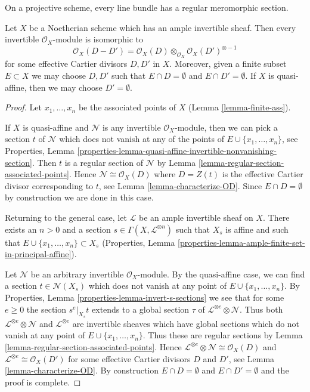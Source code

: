 \begin{lemma}
\label{lemma-quasi-projective-Noetherian-pic-effective-Cartier}
\begin{slogan}
On a projective scheme, every line bundle has a regular meromorphic section.
\end{slogan}
Let $X$ be a Noetherian scheme which has an ample invertible sheaf.
Then every invertible $\mathcal{O}_X$-module is isomorphic to
$$
\mathcal{O}_X(D - D') =
\mathcal{O}_X(D) \otimes_{\mathcal{O}_X} \mathcal{O}_X(D')^{\otimes -1}
$$
for some effective Cartier divisors $D, D'$ in $X$. Moreover, given a
finite subset $E \subset X$ we may choose $D, D'$ such that
$E \cap D = \emptyset$ and $E \cap D' = \emptyset$. If
$X$ is quasi-affine, then we may choose $D' = \emptyset$.
\end{lemma}

\begin{proof}
Let $x_1, \ldots, x_n$ be the associated points of $X$
(Lemma \ref{lemma-finite-ass}).

\medskip\noindent
If $X$ is quasi-affine and $\mathcal{N}$ is any invertible
$\mathcal{O}_X$-module, then we can pick a section $t$ of
$\mathcal{N}$ which does not vanish at any of the points
of $E \cup \{x_1, \ldots, x_n\}$, see Properties, Lemma
\ref{properties-lemma-quasi-affine-invertible-nonvanishing-section}.
Then $t$ is a regular section of $\mathcal{N}$ by
Lemma \ref{lemma-regular-section-associated-points}.
Hence $\mathcal{N} \cong \mathcal{O}_X(D)$ where
$D = Z(t)$ is the effective Cartier divisor corresponding to $t$, see
Lemma \ref{lemma-characterize-OD}. Since $E \cap D = \emptyset$
by construction we are done in this case.

\medskip\noindent
Returning to the general case, let $\mathcal{L}$ be an ample invertible sheaf
on $X$. There exists an $n > 0$ and a section
$s \in \Gamma(X, \mathcal{L}^{\otimes n})$ such that $X_s$
is affine and such that $E \cup \{x_1, \ldots, x_n\} \subset X_s$
(Properties, Lemma \ref{properties-lemma-ample-finite-set-in-principal-affine}).

\medskip\noindent
Let $\mathcal{N}$ be an arbitrary invertible $\mathcal{O}_X$-module.
By the quasi-affine case, we can find a section
$t \in \mathcal{N}(X_s)$ which does not vanish at any point
of $E \cup \{x_1, \ldots, x_n\}$.
By Properties, Lemma \ref{properties-lemma-invert-s-sections}
we see that for some $e \geq 0$ the section $s^e|_{X_s} t$ extends to
a global section $\tau$ of $\mathcal{L}^{\otimes e} \otimes \mathcal{N}$.
Thus both $\mathcal{L}^{\otimes e} \otimes \mathcal{N}$ and
$\mathcal{L}^{\otimes e}$ are invertible sheaves which have global sections
which do not vanish at any point of $E \cup \{x_1, \ldots, x_n\}$.
Thus these are regular sections by
Lemma \ref{lemma-regular-section-associated-points}.
Hence $\mathcal{L}^{\otimes e} \otimes \mathcal{N} \cong \mathcal{O}_X(D)$
and $\mathcal{L}^{\otimes e} \cong \mathcal{O}_X(D')$ for some
effective Cartier divisors $D$ and $D'$, see Lemma \ref{lemma-characterize-OD}.
By construction $E \cap D = \emptyset$ and $E \cap D' = \emptyset$
and the proof is complete.
\end{proof}

